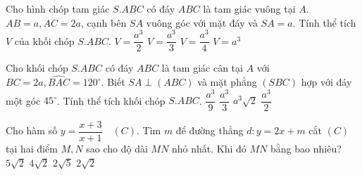 \begin{ex}%
Cho hình chóp tam giác $S.ABC$ có đáy $ABC$ là tam giác vuông tại $A$. $AB=a, AC=2a$, cạnh bên $SA$ vuông góc với mặt đáy và $SA=a$. Tính thể tích $V$ của khối chóp $S.ABC$.
\choice
{$V=\dfrac{a^3}{2}$}
{$V=\dfrac{a^3}{3}$}
{$V=\dfrac{a^3}{4}$}
{\True $V=a^3$}
\end{ex}

\begin{ex}%
Cho khối chóp $S.ABC$ có đáy $ABC$ là tam giác cân tại $A$ với $BC=2a, \widehat{BAC}=120^\circ$. Biết $SA \perp (ABC)$ và mặt phẳng $(SBC)$ hợp với đáy một góc $45^\circ$. Tính thể tích khối chóp $S.ABC$.
\choice
{\True $\dfrac{a^3}{9}$}
{$\dfrac{a^3}{3}$}
{$a^3 \sqrt{2}$}
{$\dfrac{a^3}{2}$}
\end{ex}

\begin{ex}%
Cho hàm số $y=\dfrac{x+3}{x+1} \quad (C)$. Tìm $m$ để đường thẳng $d:y=2x+m$ cắt $(C)$ tại hai điểm $M, N$ sao cho độ dài $MN$ nhỏ nhất. Khi đó $MN$ bằng bao nhiêu?
\choice
{$5\sqrt{2}$}
{$4\sqrt{2}$}
{\True $2\sqrt{5}$}
{$2\sqrt{2}$}
\end{ex}

